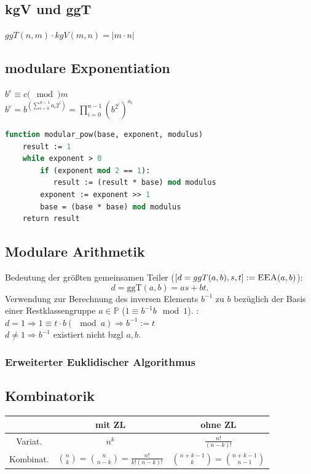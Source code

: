 \documentclass[10pt,a4paper,ngerman,oneside,]{article}
\begin{document}
\begin{multicols}{2}
\subsection{kgV und ggT}
$ggT(n,m)\cdot kgV(m,n)=|m\cdot n|$
\subsection{modulare Exponentiation}
$b^e \equiv c (\mod) m$\\
$b^e = b^{\left( \sum_{i=0}^{n-1} a_i 2^i \right)} = \prod_{i=0}^{n-1} \left( b^{2^i} \right) ^ {a_i}$
\begin{lstlisting}[language=pascal]
function modular_pow(base, exponent, modulus)
    result := 1
    while exponent > 0
        if (exponent mod 2 == 1):
           result := (result * base) mod modulus
        exponent := exponent >> 1
        base = (base * base) mod modulus
    return result
\end{lstlisting}


\subsection{Modulare Arithmetik}
Bedeutung der größten gemeinsamen Teiler ($[d = ggT(a,b),s,t]:=\textsc{EEA}(a,b)$):
\[ d = \text{ggT}(a,b) = as+bt. \]
Verwendung zur Berechnung des inversen Elements $b^{-1}$ zu $b$ bezüglich der Basis einer Restklassengruppe $a\in\mathbb{P}$ ($1\equiv b^{-1}b \mod 1$). :\\
$d=1\Rightarrow 1\equiv t\cdot b (\mod a)\Rightarrow b^{-1}:=t$\\
$d\neq 1 \Rightarrow b^{-1}$ existiert nicht bzgl $a,b$.
\subsubsection{Erweiterter Euklidischer Algorithmus}
\subsection{Kombinatorik}
\begin{tabular}{|c||c|c|}\hline
 & mit ZL & ohne ZL\\\hline\hline
Variat. & $n^k$ & $\frac{n!}{(n-k)!}$\\\hline
Kombinat. & $\binom{n}{k}=\binom{n}{n-k}=\frac{n!}{k!(n-k)!}$ & $\binom{n+k-1}{k}=\binom{n+k-1}{n-1}$\\\hline
\end{tabular}

\end{multicols}
\end{document}
